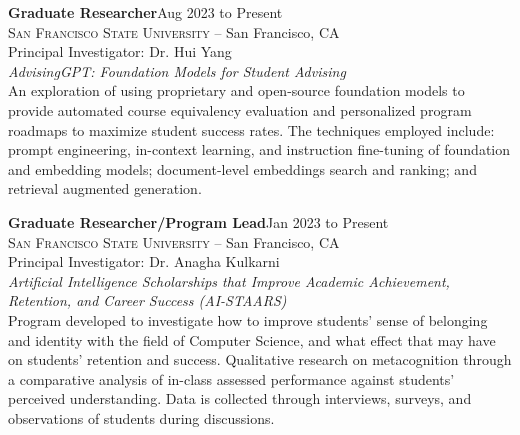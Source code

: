 \documentclass[hidelinks, 10.5pt]{article}
\newcommand{\contentwidth}{0.9\linewidth}
\newcommand{\contentspacing}{2.5mm}
\begin{document}
{{    \begin{minipage}[ct]{\contentwidth}
        \textbf{Graduate Researcher}\hfill Aug 2023 to Present\\
        \textsc{San Francisco State University} -- San Francisco, CA\\
        Principal Investigator: Dr. Hui Yang\vspace{1mm}\\
        {\textit{AdvisingGPT: Foundation Models for Student Advising}}\\
        An exploration of using proprietary and open-source foundation models to provide automated course equivalency evaluation and
        personalized program roadmaps to maximize student success rates. The techniques employed include: prompt engineering, in-context
        learning, and instruction fine-tuning of foundation and embedding models; document-level embeddings search and ranking; and
        retrieval augmented generation.
    \end{minipage}

    \vspace{\contentspacing}

    \begin{minipage}[ct]{\contentwidth}
        \textbf{Graduate Researcher/Program Lead}\hfill Jan 2023 to Present\\
        \textsc{San Francisco State University} -- San Francisco, CA\\
        Principal Investigator: Dr. Anagha Kulkarni\vspace{1mm}\\
        {\textit{Artificial Intelligence Scholarships that Improve Academic Achievement, Retention, and Career Success (AI-STAARS)}}\\
        Program developed to investigate how to improve students' sense of belonging and identity with the field of Computer Science,
        and what effect that may have on students' retention and success.  Qualitative research on metacognition through a comparative
        analysis of in-class assessed performance against students' perceived understanding.  Data is collected through interviews, surveys,
        and observations of students during discussions.
    \end{minipage}

}}
\end{document}
